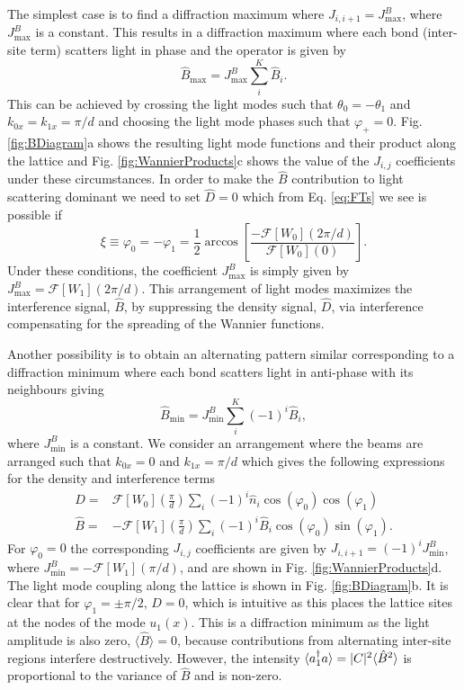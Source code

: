 The simplest case is to find a diffraction maximum where
$J_{i,i+1} = J^B_\mathrm{max}$, where $J^B_\mathrm{max}$ is a
constant. This results in a diffraction maximum where each bond
(inter-site term) scatters light in phase and the operator is given by
\begin{equation}
  \hat{B}_\mathrm{max} = J^B_\mathrm{max} \sum_i^K \hat{B}_i .
\end{equation}
This can be achieved by crossing the light modes such that
$\theta_0 = -\theta_1$ and $k_{0x} = k_{1x} = \pi/d$ and choosing the
light mode phases such that $\varphi_+ = 0$. Fig. \ref{fig:BDiagram}a
shows the resulting light mode functions and their product along the
lattice and Fig. \ref{fig:WannierProducts}c shows the value of the
$J_{i,j}$ coefficients under these circumstances. In order to make the
$\hat{B}$ contribution to light scattering dominant we need to set
$\hat{D} = 0$ which from Eq. \eqref{eq:FTs} we see is possible if
\begin{equation}
  \xi \equiv \varphi_0 = -\varphi_1 =
  \frac{1}{2}\arccos\left[\frac{-\mathcal{F}[W_0](2\pi/d)}{\mathcal{F}[W_0](0)}\right].
\end{equation}
Under these conditions, the coefficient $J^B_\mathrm{max}$ is simply
given by $J^B_\mathrm{max} = \mathcal{F}[W_1](2 \pi / d)$. This
arrangement of light modes maximizes the interference signal,
$\hat{B}$, by suppressing the density signal, $\hat{D}$, via
interference compensating for the spreading of the Wannier functions.

Another possibility is to obtain an alternating pattern similar
corresponding to a diffraction minimum where each bond scatters light
in anti-phase with its neighbours giving
\begin{equation}
  \hat{B}_\mathrm{min} = J^B_\mathrm{min} \sum_i^K (-1)^i \hat{B}_i,
\end{equation}
where $J^B_\mathrm{min}$ is a constant. We consider an arrangement
where the beams are arranged such that $k_{0x} = 0$ and
$k_{1x} = \pi/d$ which gives the following expressions for the density
and interference terms
\begin{align}
  \label{eq:DMin}
  \hat{D} = & \mathcal{F}[W_0]\left(\frac{\pi}{d}\right) \sum_i (-1)^i \hat{n}_i
              \cos(\varphi_0) \cos(\varphi_1) \nonumber \\ 
  \hat{B} = & -\mathcal{F}[W_1]\left(\frac{\pi}{d}\right) \sum_i (-1)^i \hat{B}_i
              \cos(\varphi_0) \sin(\varphi_1).
\end{align}
For $\varphi_0 = 0$ the corresponding $J_{i,j}$ coefficients are given
by $J_{i,i+1} = (-1)^i J^B_\mathrm{min}$, where
$J^B_\mathrm{min} = -\mathcal{F}[W_1](\pi / d)$, and are shown in
Fig. \ref{fig:WannierProducts}d. The light mode coupling along the
lattice is shown in Fig. \ref{fig:BDiagram}b. It is clear that for
$\varphi_1 = \pm \pi/2$, $\hat{D} = 0$, which is intuitive as this
places the lattice sites at the nodes of the mode $u_1(x)$. This is a
diffraction minimum as the light amplitude is also zero,
$\langle \hat{B} \rangle = 0$, because contributions from alternating
inter-site regions interfere destructively. However, the intensity
$\langle a^\dagger_1 a \rangle = |C|^2 \langle \hat{B}^2 \rangle$ is
proportional to the variance of $\hat{B}$ and is non-zero.

